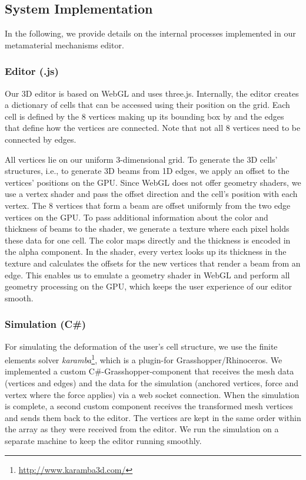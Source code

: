 \subsection{System Implementation}
\label{section:mechanisms-editor}

In the following, we provide details on the internal processes implemented in our metamaterial mechanisms editor.

\subsubsection{Editor (.js)}
Our 3D editor is based on WebGL and uses three.js. Internally, the editor creates a dictionary of cells that can be accessed using their position on the grid. Each cell is defined by the 8 vertices making up its bounding box by and the edges that define how the vertices are connected. Note that not all 8 vertices need to be connected by edges. 

All vertices lie on our uniform 3-dimensional grid. To generate the 3D cells' structures, i.e., to generate 3D beams from 1D edges, we apply an offset to the vertices’ positions on the GPU. Since WebGL does not offer geometry shaders, we use a vertex shader and pass the offset direction and the cell’s position with each vertex. The 8 vertices that form a beam are offset uniformly from the two edge vertices on the GPU. To pass additional information about the color and thickness of beams to the shader, we generate a texture where each pixel holds these data for one cell. The color maps directly and the thickness is encoded in the alpha component. In the shader, every vertex looks up its thickness in the texture and calculates the offsets for the new vertices that render a beam from an edge. This enables us to emulate a geometry shader in WebGL and perform all geometry processing on the GPU, which keeps the user experience of our editor smooth.

\subsubsection{Simulation (C\#)}
For simulating the deformation of the user’s cell structure, we use the finite elements solver \textit{karamba}\footnote{\url{http://www.karamba3d.com/}}, which is a plugin-for Grasshopper/Rhinoceros. We implemented a custom C\#-Grasshopper-component that receives the mesh data (vertices and edges) and the data for the simulation (anchored vertices, force and vertex where the force applies) via a web socket connection. When the simulation is complete, a second custom component receives the transformed mesh vertices and sends them back to the editor. The vertices are kept in the same order within the array as they were received from the editor. We run the simulation on a separate machine to keep the editor running smoothly. 

